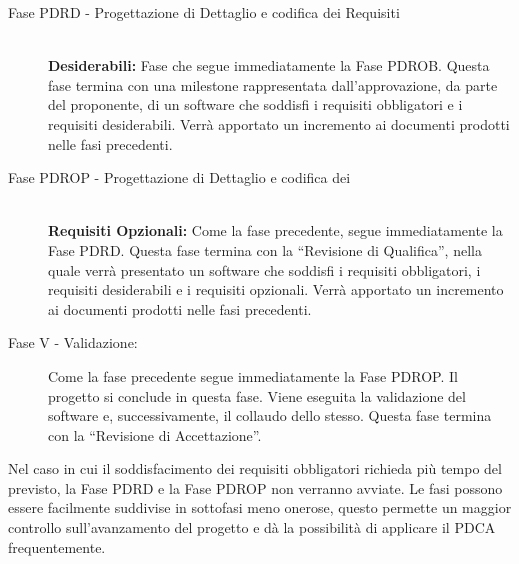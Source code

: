 \documentclass[../PianoProgetto.tex]{subfiles}
\begin{document}
\begin{description}
  
	\item[Fase PDRD - Progettazione di Dettaglio e codifica dei Requisiti] \ \\
		\textbf{Desiderabili:}
		Fase che segue immediatamente la Fase PDROB. Questa fase termina con una milestone rappresentata dall’approvazione, da parte del proponente, di un software che soddisfi i requisiti obbligatori e i requisiti desiderabili.
		Verrà apportato un incremento ai documenti prodotti nelle fasi precedenti.


	\item[Fase PDROP - Progettazione di Dettaglio e codifica dei ] \ \\
		\textbf{Requisiti Opzionali:}
		Come la fase precedente, segue immediatamente la Fase PDRD. Questa fase termina con la “Revisione di Qualifica”, nella quale verrà presentato un software che soddisfi i requisiti obbligatori, i requisiti desiderabili e i requisiti opzionali.
		Verrà apportato un incremento ai documenti prodotti nelle fasi precedenti.


	\item[Fase V - Validazione:] Come la fase precedente segue immediatamente la Fase PDROP. Il progetto si conclude in questa fase. Viene eseguita la validazione del software e, successivamente, il collaudo dello stesso.
		Questa fase termina con la “Revisione di Accettazione”. 
		
	\end{description}
	
		Nel caso in cui il soddisfacimento dei requisiti obbligatori richieda più tempo del previsto, la Fase PDRD e la Fase PDROP non verranno avviate.
		Le fasi possono essere facilmente suddivise in sottofasi meno onerose, questo permette un maggior controllo sull’avanzamento del progetto e dà la possibilità di applicare il PDCA frequentemente.
\end{document}
